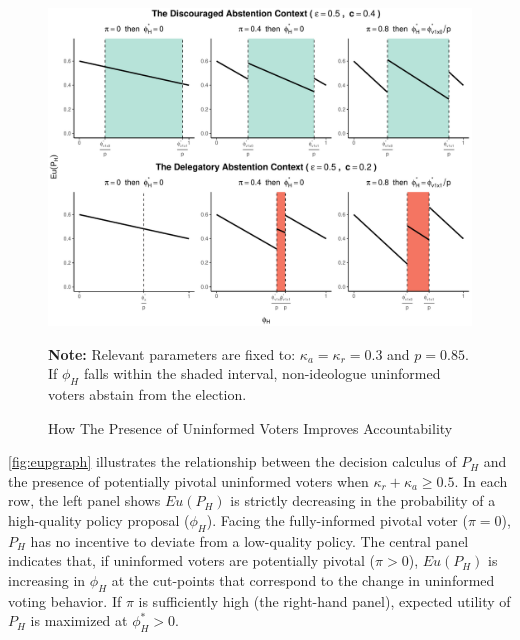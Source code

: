 \documentclass[letterpaper, 12pt]{article}
\newcommand{\floatnote}[1]{\vspace{\abovecaptionskip}\caption*{\textbf{Note:} #1}\vspace{-\abovecaptionskip}}
\begin{document}
    \begin{figure}[t!]
        \caption{How The Presence of Uninformed Voters Improves Accountability}
        \label{fig:eupgraph}
        \includegraphics[width=\linewidth]{figure/eupgraph-1}
        \floatnote{Relevant parameters are fixed to: $\kappa_a = \kappa_r = 0.3$ and $p=0.85$. If $\phi_H$ falls within the shaded interval, non-ideologue uninformed voters abstain from the election.}
    \end{figure}
    
    \par \autoref{fig:eupgraph} illustrates the relationship between the decision calculus of $P_H$ and the presence of potentially pivotal uninformed voters when $\kappa_{r}+\kappa_{a}\geq 0.5$. %
    In each row, the left panel shows $Eu(P_H)$ is strictly decreasing in the probability of a high-quality policy proposal ($\phi_H$). Facing the fully-informed pivotal voter ($\pi=0$), $P_H$ has no incentive to deviate from a low-quality policy. The central panel indicates that, if uninformed voters are potentially pivotal ($\pi>0$), $Eu(P_H)$ is increasing in $\phi_H$ at the cut-points that correspond to the change in uninformed voting behavior. If $\pi$ is sufficiently high (the right-hand panel), expected utility of $P_H$ is maximized at $\phi^*_H>0$.
    
\end{document}
